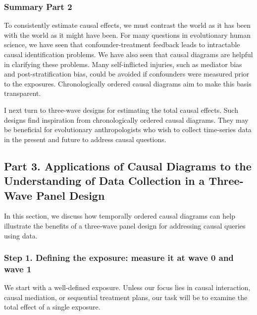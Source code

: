 \documentclass[
  singlecolumn]{article}
\begin{document}
\hypertarget{summary-part-2}{%
\subsubsection{Summary Part 2}\label{summary-part-2}}

To consistently estimate causal effects, we must contrast the world as
it has been with the world as it might have been. For many questions in
evolutionary human science, we have seen that confounder-treatment
feedback leads to intractable causal identification problems. We have
also seen that causal diagrams are helpful in clarifying these problems.
Many self-inflicted injuries, such as mediator bias and
post-stratification bias, could be avoided if confounders were measured
prior to the exposures. Chronologically ordered causal diagrams aim to
make this basis transparent.

I next turn to three-wave designs for estimating the total causal
effects. Such designs find inspiration from chronologically ordered
causal diagrams. They may be beneficial for evolutionary anthropologists
who wish to collect time-series data in the present and future to
address causal questions.

\hypertarget{part-3.-applications-of-causal-diagrams-to-the-understanding-of-data-collection-in-a-three-wave-panel-design}{%
\subsection{Part 3. Applications of Causal Diagrams to the Understanding
of Data Collection in a Three-Wave Panel
Design}\label{part-3.-applications-of-causal-diagrams-to-the-understanding-of-data-collection-in-a-three-wave-panel-design}}

In this section, we discuss how temporally ordered causal diagrams can
help illustrate the benefits of a three-wave panel design for addressing
causal queries using data.

\hypertarget{step-1.-defining-the-exposure-measure-it-at-wave-0-and-wave-1}{%
\subsubsection{Step 1. Defining the exposure: measure it at wave 0 and
wave
1}\label{step-1.-defining-the-exposure-measure-it-at-wave-0-and-wave-1}}

We start with a well-defined exposure. Unless our focus lies in causal
interaction, causal mediation, or sequential treatment plans, our task
will be to examine the total effect of a single exposure.
\end{document}
